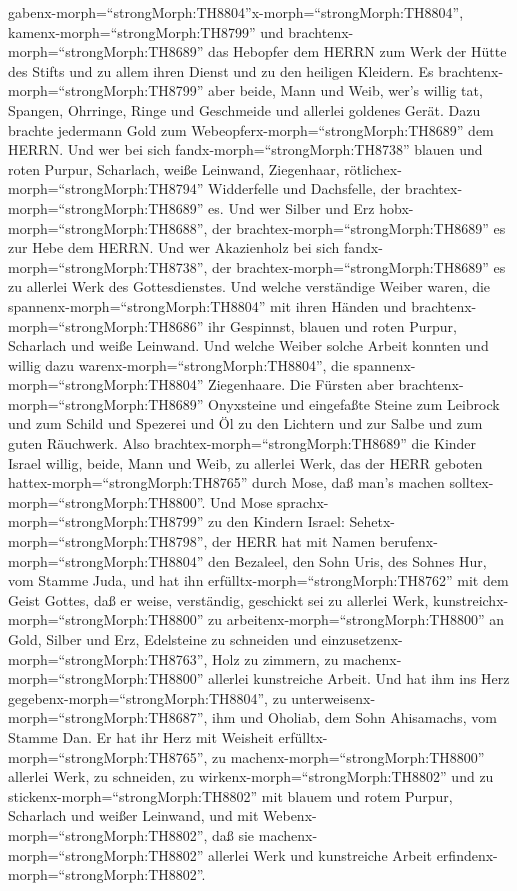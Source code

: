 gabenx-morph=``strongMorph:TH8804''x-morph=``strongMorph:TH8804'',
kamenx-morph=``strongMorph:TH8799'' und
brachtenx-morph=``strongMorph:TH8689'' das Hebopfer dem HERRN zum Werk
der Hütte des Stifts und zu allem ihren Dienst und zu den heiligen
Kleidern.  Es brachtenx-morph=``strongMorph:TH8799'' aber
beide, Mann und Weib, wer's willig tat, Spangen, Ohrringe, Ringe und
Geschmeide und allerlei goldenes Gerät. Dazu brachte jedermann Gold zum
Webeopferx-morph=``strongMorph:TH8689'' dem HERRN.  Und wer
bei sich fandx-morph=``strongMorph:TH8738'' blauen und roten Purpur,
Scharlach, weiße Leinwand, Ziegenhaar,
rötlichex-morph=``strongMorph:TH8794'' Widderfelle und Dachsfelle, der
brachtex-morph=``strongMorph:TH8689'' es.  Und wer Silber
und Erz hobx-morph=``strongMorph:TH8688'', der
brachtex-morph=``strongMorph:TH8689'' es zur Hebe dem HERRN. Und wer
Akazienholz bei sich fandx-morph=``strongMorph:TH8738'', der
brachtex-morph=``strongMorph:TH8689'' es zu allerlei Werk des
Gottesdienstes.  Und welche verständige Weiber waren, die
spannenx-morph=``strongMorph:TH8804'' mit ihren Händen und
brachtenx-morph=``strongMorph:TH8686'' ihr Gespinnst, blauen und roten
Purpur, Scharlach und weiße Leinwand.  Und welche Weiber
solche Arbeit konnten und willig dazu
warenx-morph=``strongMorph:TH8804'', die
spannenx-morph=``strongMorph:TH8804'' Ziegenhaare.  Die
Fürsten aber brachtenx-morph=``strongMorph:TH8689'' Onyxsteine und
eingefaßte Steine zum Leibrock und zum Schild  und Spezerei
und Öl zu den Lichtern und zur Salbe und zum guten Räuchwerk.
 Also brachtex-morph=``strongMorph:TH8689'' die Kinder
Israel willig, beide, Mann und Weib, zu allerlei Werk, das der HERR
geboten hattex-morph=``strongMorph:TH8765'' durch Mose, daß man's machen
solltex-morph=``strongMorph:TH8800''.  Und Mose
sprachx-morph=``strongMorph:TH8799'' zu den Kindern Israel:
Sehetx-morph=``strongMorph:TH8798'', der HERR hat mit Namen
berufenx-morph=``strongMorph:TH8804'' den Bezaleel, den Sohn Uris, des
Sohnes Hur, vom Stamme Juda,  und hat ihn
erfülltx-morph=``strongMorph:TH8762'' mit dem Geist Gottes, daß er
weise, verständig, geschickt sei zu allerlei Werk, 
kunstreichx-morph=``strongMorph:TH8800'' zu
arbeitenx-morph=``strongMorph:TH8800'' an Gold, Silber und Erz,
 Edelsteine zu schneiden und
einzusetzenx-morph=``strongMorph:TH8763'', Holz zu zimmern, zu
machenx-morph=``strongMorph:TH8800'' allerlei kunstreiche Arbeit.
 Und hat ihm ins Herz
gegebenx-morph=``strongMorph:TH8804'', zu
unterweisenx-morph=``strongMorph:TH8687'', ihm und Oholiab, dem Sohn
Ahisamachs, vom Stamme Dan.  Er hat ihr Herz mit Weisheit
erfülltx-morph=``strongMorph:TH8765'', zu
machenx-morph=``strongMorph:TH8800'' allerlei Werk, zu schneiden, zu
wirkenx-morph=``strongMorph:TH8802'' und zu
stickenx-morph=``strongMorph:TH8802'' mit blauem und rotem Purpur,
Scharlach und weißer Leinwand, und mit
Webenx-morph=``strongMorph:TH8802'', daß sie
machenx-morph=``strongMorph:TH8802'' allerlei Werk und kunstreiche
Arbeit erfindenx-morph=``strongMorph:TH8802''.

